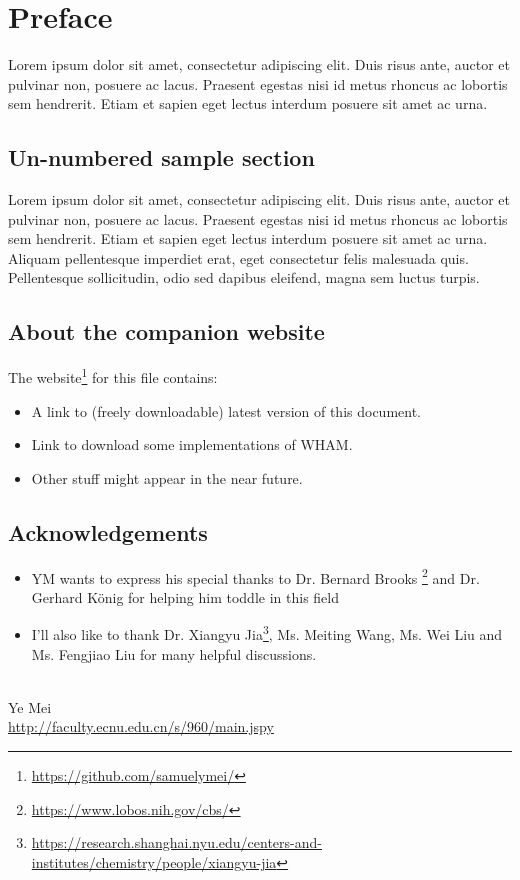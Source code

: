 \chapter*{Preface}
Lorem ipsum dolor sit amet, consectetur adipiscing elit. Duis risus ante, auctor et pulvinar non, posuere ac lacus. Praesent egestas nisi id metus rhoncus ac lobortis sem hendrerit. Etiam et sapien eget lectus interdum posuere sit amet ac urna.

\section*{Un-numbered sample section}
Lorem ipsum dolor sit amet, consectetur adipiscing elit. Duis risus ante, auctor et pulvinar non, posuere ac lacus. Praesent egestas nisi id metus rhoncus ac lobortis sem hendrerit. Etiam et sapien eget lectus interdum posuere sit amet ac urna. Aliquam pellentesque imperdiet erat, eget consectetur felis malesuada quis. Pellentesque sollicitudin, odio sed dapibus eleifend, magna sem luctus turpis.

\section*{About the companion website}
The website\footnote{\url{https://github.com/samuelymei/}} for this file contains:
\begin{itemize}
  \item A link to (freely downloadable) latest version of this document.
  \item Link to download some implementations of WHAM.
  \item Other stuff might appear in the near future.
\end{itemize}

\section*{Acknowledgements}
\begin{itemize}
\item YM wants to express his special thanks to Dr. Bernard Brooks \footnote{\url{https://www.lobos.nih.gov/cbs/}} and Dr. Gerhard K\"onig for helping him toddle in this field
\item I'll also like to thank Dr. Xiangyu Jia\footnote{\url{https://research.shanghai.nyu.edu/centers-and-institutes/chemistry/people/xiangyu-jia}}, Ms. Meiting Wang, Ms. Wei Liu and Ms. Fengjiao Liu for many helpful discussions.
\end{itemize}
\mbox{}\\
\noindent Ye Mei \\
\noindent \url{http://faculty.ecnu.edu.cn/s/960/main.jspy}